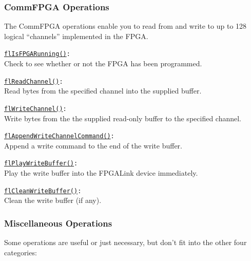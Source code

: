 \subsubsection{CommFPGA Operations}
The CommFPGA operations enable you to read from and write to up to 128 logical ``channels'' implemented in the FPGA.

\begin{desc}
  \item[\texttt{\href{http://www.swaton.ukfsn.org/bin/fpgalink-MAKESTUFF_TODAY_DATE/api/libfpgalink\_8h.html\#ae9a64e022ac9607d71d9b7de80508b12}{flIsFPGARunning()}:}] \hfill \\
    Check to see whether or not the FPGA has been programmed.
  \item[\texttt{\href{http://www.swaton.ukfsn.org/bin/fpgalink-MAKESTUFF_TODAY_DATE/api/libfpgalink\_8h.html\#a0478f3526c4cdaadb844288b7e60e949}{flReadChannel()}:}] \hfill \\
    Read bytes from the specified channel into the supplied buffer.
  \item[\texttt{\href{http://www.swaton.ukfsn.org/bin/fpgalink-MAKESTUFF_TODAY_DATE/api/libfpgalink\_8h.html\#ac2b8dfb0a19a357a28af9986e6a50966}{flWriteChannel()}:}] \hfill \\
    Write bytes from the the supplied read-only buffer to the specified channel.
  \item[\texttt{\href{http://www.swaton.ukfsn.org/bin/fpgalink-MAKESTUFF_TODAY_DATE/api/libfpgalink\_8h.html\#a92ca0a05d4c363a3e9444e1b9dc9b8fa}{flAppendWriteChannelCommand()}:}] \hfill \\
    Append a write command to the end of the write buffer.
  \item[\texttt{\href{http://www.swaton.ukfsn.org/bin/fpgalink-MAKESTUFF_TODAY_DATE/api/libfpgalink\_8h.html\#a0cbf4cd4df8c8cee73a70022b3467499}{flPlayWriteBuffer()}:}] \hfill \\
    Play the write buffer into the FPGALink device immediately.
  \item[\texttt{\href{http://www.swaton.ukfsn.org/bin/fpgalink-MAKESTUFF_TODAY_DATE/api/libfpgalink\_8h.html\#a36644c7d3ec966f4983dd8d17a9b2dc4}{flCleanWriteBuffer()}:}] \hfill \\
    Clean the write buffer (if any).
\end{desc}

\subsubsection{Miscellaneous Operations}
Some operations are useful or just necessary, but don't fit into the other four categories: 


